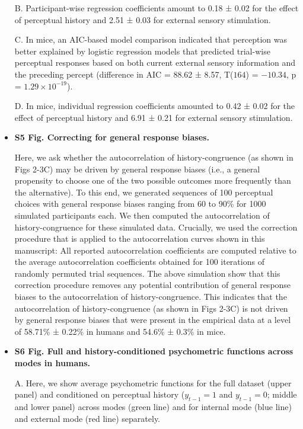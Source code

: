 \documentclass[
]{article}
\begin{document}
\begin{itemize}
B. Participant-wise regression coefficients amount to 0.18 ± 0.02 for
the effect of perceptual history and 2.51 ± 0.03 for external sensory
stimulation.

C. In mice, an AIC-based model comparison indicated that perception was
better explained by logistic regression models that predicted trial-wise
perceptual responses based on both current external sensory information
and the preceding percept (difference in AIC = 88.62 ± 8.57, T(\(164\))
= \(-10.34\), p = \(\ensuremath{1.29\times 10^{-19}}\)).

D. In mice, individual regression coefficients amounted to 0.42 ± 0.02
for the effect of perceptual history and 6.91 ± 0.21 for external
sensory stimulation.

\item \textbf{S5 Fig. Correcting for general response biases.}

Here, we ask whether the autocorrelation of history-congruence (as shown
in Figs 2-3C) may be driven by general response biases (i.e., a
general propensity to choose one of the two possible outcomes more
frequently than the alternative). To this end, we generated sequences of
100 perceptual choices with general response biases ranging from 60 to
90\% for 1000 simulated participants each. We then computed the
autocorrelation of history-congruence for these simulated data.
Crucially, we used the correction procedure that is applied to the
autocorrelation curves shown in this manuscript: All reported
autocorrelation coefficients are computed relative to the average
autocorrelation coefficients obtained for 100 iterations of randomly
permuted trial sequences. The above simulation show that this correction
procedure removes any potential contribution of general response biases
to the autocorrelation of history-congruence. This indicates that the
autocorrelation of history-congruence (as shown in Figs 2-3C) is not
driven by general response biases that were present in the empirical
data at a level of 58.71\% ± 0.22\% in humans and 54.6\% ± 0.3\% in
mice.

\item \textbf{S6 Fig. Full and history-conditioned psychometric functions across modes in humans.}

A. Here, we show average psychometric functions for the full dataset
(upper panel) and conditioned on perceptual history (\(y_{t-1} = 1\) and
\(y_{t-1} = 0\); middle and lower panel) across modes (green line) and
for internal mode (blue line) and external mode (red line) separately.


\end{itemize}
\end{document}
